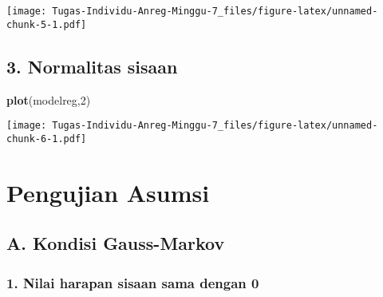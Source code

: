 \documentclass[
]{article}
\newenvironment{Shaded}{\begin{snugshade}}{\end{snugshade}}
\newcommand{\AttributeTok}[1]{\textcolor[rgb]{0.13,0.29,0.53}{#1}}
\newcommand{\DecValTok}[1]{\textcolor[rgb]{0.00,0.00,0.81}{#1}}
\newcommand{\FloatTok}[1]{\textcolor[rgb]{0.00,0.00,0.81}{#1}}
\newcommand{\FunctionTok}[1]{\textcolor[rgb]{0.13,0.29,0.53}{\textbf{#1}}}
\newcommand{\NormalTok}[1]{#1}
\newcommand{\SpecialCharTok}[1]{\textcolor[rgb]{0.81,0.36,0.00}{\textbf{#1}}}
\newcommand{\StringTok}[1]{\textcolor[rgb]{0.31,0.60,0.02}{#1}}
\begin{document}
\begin{Shaded}
\end{Shaded}

\texttt{[image: Tugas-Individu-Anreg-Minggu-7\_files/figure-latex/unnamed-chunk-5-1.pdf]}

\hypertarget{normalitas-sisaan}{%
\subsection{3. Normalitas sisaan}\label{normalitas-sisaan}}

\begin{Shaded}
\begin{Highlighting}[]
\FunctionTok{plot}\NormalTok{(modelreg,}\DecValTok{2}\NormalTok{)}
\end{Highlighting}
\end{Shaded}

\texttt{[image: Tugas-Individu-Anreg-Minggu-7\_files/figure-latex/unnamed-chunk-6-1.pdf]}

\hypertarget{pengujian-asumsi}{%
\section{Pengujian Asumsi}\label{pengujian-asumsi}}

\hypertarget{a.-kondisi-gauss-markov}{%
\subsection{A. Kondisi Gauss-Markov}\label{a.-kondisi-gauss-markov}}

\hypertarget{nilai-harapan-sisaan-sama-dengan-0}{%
\subsubsection{1. Nilai harapan sisaan sama dengan
0}\label{nilai-harapan-sisaan-sama-dengan-0}}

\begin{Shaded}
\end{Shaded}
\end{document}

